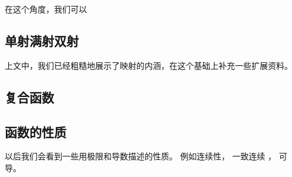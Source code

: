 在这个角度，我们可以


\subsection{单射满射双射}

上文中，我们已经粗糙地展示了映射的内涵，在这个基础上补充一些扩展资料。

\subsection{复合函数}


\subsection{函数的性质}
以后我们会看到一些用极限和导数描述的性质。 例如连续性， 一致连续 %
， 可导。
